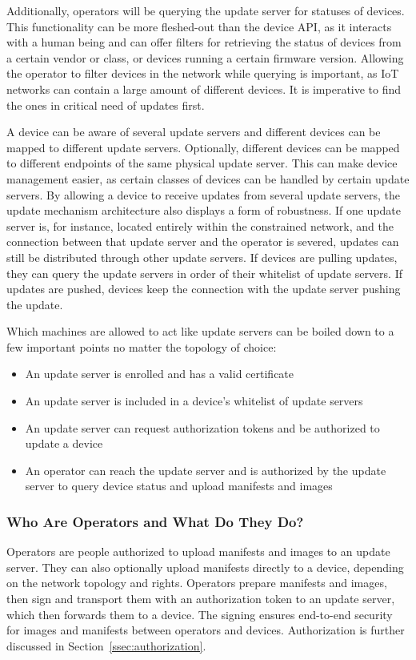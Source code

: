 \documentclass[0-thesis.tex]{subfiles}
\begin{document}
Additionally, operators will be querying the update server for statuses of devices. This
functionality can be more fleshed-out than the device API, as it interacts with a human
being and can offer filters for retrieving the status of devices from a certain vendor or
class, or devices running a certain firmware version. Allowing the operator to filter
devices in the network while querying is important, as IoT networks can contain a large
amount of different devices. It is imperative to find the ones in critical need of
updates first.

A device can be aware of several update servers and different devices can be mapped to
different update servers. Optionally, different devices can be mapped to different
endpoints of the same physical update server. This can make device management easier, as
certain classes of devices can be handled by certain update servers. By allowing a device
to receive updates from several update servers, the update mechanism architecture also
displays a form of robustness. If one update server is, for instance, located entirely
within the constrained network, and the connection between that update server and the
operator is severed, updates can still be distributed through other update servers. If
devices are pulling updates, they can query the update servers in order of their whitelist
of update servers. If updates are pushed, devices keep the connection with the update
server pushing the update.

Which machines are allowed to act like update servers can be boiled down to a few
important points no matter the topology of choice:

\begin{itemize}
    \item An update server is enrolled and has a valid certificate
    \item An update server is included in a device's whitelist of update servers
    \item An update server can request authorization tokens and be authorized to update a
            device
    \item An operator can reach the update server and is authorized by the update server
            to query device status and upload manifests and images
\end{itemize}

\subsubsection{Who Are Operators and What Do They Do?}
\label{sssec:what-is-an-operator}
Operators are people authorized to upload manifests and images to an update server. They
can also optionally upload manifests directly to a device, depending on the network
topology and rights. Operators prepare manifests and images, then sign and transport them
with an authorization token to an update server, which then forwards them to a device. The
signing ensures end-to-end security for images and manifests between operators and
devices. Authorization is further discussed in Section~\ref{ssec:authorization}.
\end{document}

